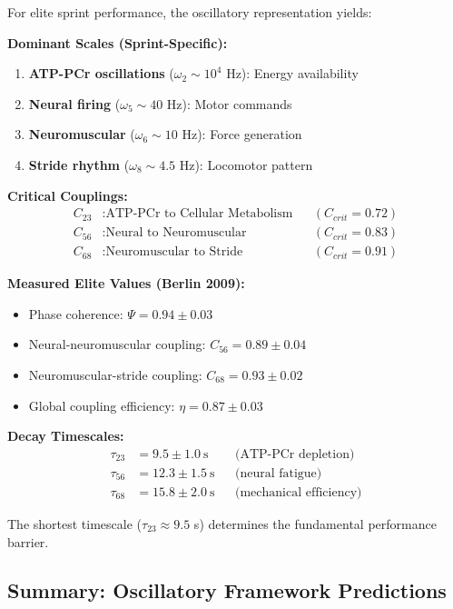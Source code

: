 For elite sprint performance, the oscillatory representation yields:

\textbf{Dominant Scales (Sprint-Specific):}
\begin{enumerate}
\item \textbf{ATP-PCr oscillations} ($\omega_2 \sim 10^4$ Hz): Energy availability
\item \textbf{Neural firing} ($\omega_5 \sim 40$ Hz): Motor commands
\item \textbf{Neuromuscular} ($\omega_6 \sim 10$ Hz): Force generation
\item \textbf{Stride rhythm} ($\omega_8 \sim 4.5$ Hz): Locomotor pattern
\end{enumerate}

\textbf{Critical Couplings:}
\begin{align}
C_{23} &: \text{ATP-PCr to Cellular Metabolism} && (C_{crit} = 0.72) \\
C_{56} &: \text{Neural to Neuromuscular} && (C_{crit} = 0.83) \\
C_{68} &: \text{Neuromuscular to Stride} && (C_{crit} = 0.91)
\end{align}

\textbf{Measured Elite Values (Berlin 2009):}
\begin{itemize}
\item Phase coherence: $\Psi = 0.94 \pm 0.03$
\item Neural-neuromuscular coupling: $C_{56} = 0.89 \pm 0.04$
\item Neuromuscular-stride coupling: $C_{68} = 0.93 \pm 0.02$
\item Global coupling efficiency: $\eta = 0.87 \pm 0.03$
\end{itemize}

\textbf{Decay Timescales:}
\begin{align}
\tau_{23} &= 9.5 \pm 1.0~\text{s} && \text{(ATP-PCr depletion)} \\
\tau_{56} &= 12.3 \pm 1.5~\text{s} && \text{(neural fatigue)} \\
\tau_{68} &= 15.8 \pm 2.0~\text{s} && \text{(mechanical efficiency)}
\end{align}

The shortest timescale ($\tau_{23} \approx 9.5$ s) determines the fundamental performance barrier.

\subsection{Summary: Oscillatory Framework Predictions}

